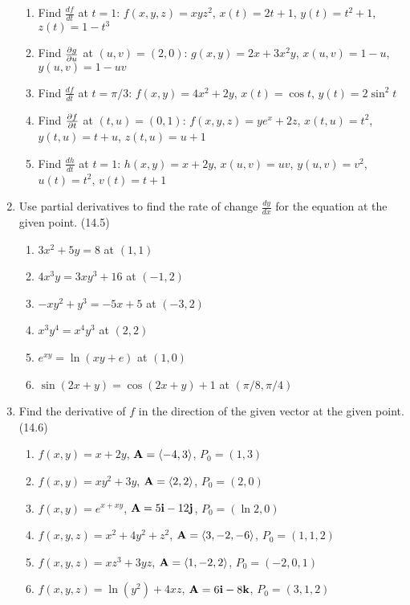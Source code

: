 \begin{enumerate}
      \begin{enumerate}
        \item Find $\frac{df}{dt}$ at $t=1$: \newline
          $f(x,y,z)=xyz^2$, $x(t)=2t+1$, $y(t)=t^2+1$, $z(t)=1-t^3$
        \item Find $\frac{\partial g}{\partial u}$ at $(u,v)=(2,0)$: \newline
          $g(x,y)=2x+3x^2y$, $x(u,v)=1-u$, $y(u,v)=1-uv$
        \item Find $\frac{df}{dt}$ at $t=\pi/3$: \newline
          $f(x,y)=4x^2+2y$, $x(t)=\cos t$, $y(t)=2\sin^2 t$
        \item Find $\frac{\partial f}{\partial t}$ at $(t,u)=(0,1)$: \newline
          $f(x,y,z)=ye^x+2z$, $x(t,u)=t^2$, $y(t,u)=t+u$, $z(t,u)=u+1$
        \item Find $\frac{dh}{dt}$ at $t=1$: \newline
          $h(x,y)=x+2y$, $x(u,v)=uv$, $y(u,v)=v^2$, $u(t)=t^2$, $v(t)=t+1$
      \end{enumerate}

    \item Use partial derivatives to find the rate of change $\frac{dy}{dx}$ for the equation at the given point. (14.5)

      \begin{enumerate}
        \item $3x^2+5y=8$ at $(1,1)$
        \item $4x^3y=3xy^3+16$ at $(-1,2)$
        \item $-xy^2+y^3=-5x+5$ at $(-3,2)$
        \item $x^3y^4=x^4y^3$ at $(2,2)$
        \item $e^{xy}=\ln(xy+e)$ at $(1,0)$
        \item $\sin(2x+y)=\cos(2x+y)+1$ at $(\pi/8,\pi/4)$
      \end{enumerate}

    \item Find the derivative of $f$ in the direction of the given vector at the given point. (14.6)

      \begin{enumerate}
        \item $f(x,y)=x+2y$, $\mathbf{A}=\left<-4,3\right>$, $P_0=(1,3)$
        \item $f(x,y)=xy^2+3y$, $\mathbf{A}=\left<2,2\right>$, $P_0=(2,0)$
        \item $f(x,y)=e^{x+xy}$, $\mathbf{A}=5\mathbf{i}-12\mathbf{j}$, $P_0=(\ln 2,0)$
        \item $f(x,y,z)=x^2+4y^2+z^2$, $\mathbf{A}=\left<3,-2,-6\right>$, $P_0=(1,1,2)$
        \item $f(x,y,z)=xz^3+3yz$, $\mathbf{A}=\left<1,-2,2\right>$, $P_0=(-2,0,1)$
        \item $f(x,y,z)=\ln(y^2)+4xz$, $\mathbf{A}=6\mathbf{i}-8\mathbf{k}$, $P_0=(3,1,2)$
      \end{enumerate}


\end{enumerate}
